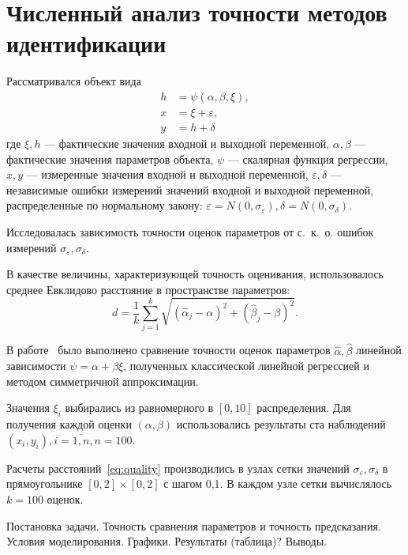 \section{Численный анализ точности методов идентификации}

Рассматривался объект вида
\begin{equation}
  \label{eq:model}
  \begin{aligned}
  h &= \psi (\alpha, \beta, \xi), \\
  x &= \xi + \varepsilon, \\
  y &= h + \delta
  \end{aligned}
\end{equation}
где
\( \xi, h \) --- фактические значения входной и выходной переменной,
\( \alpha, \beta \) --- фактические значения параметров объекта,
\( \psi \) --- скалярная функция регрессии,
\( x, y \) --- измеренные значения входной и выходной переменной,
\( \varepsilon, \delta \) --- независимые ошибки измерений значений входной и выходной переменной,
распределенные по нормальному закону:
\( \varepsilon = N(0, \sigma_{\varepsilon}), \delta = N(0, \sigma_{\delta}) \).

Исследовалась зависимость точности оценок параметров от с.~к.~о.
ошибок измерений \( \sigma_{\varepsilon}, \sigma_{\delta} \).

В качестве величины, характеризующей точность оценивания,
использовалось среднее Евклидово расстояние в пространстве параметров:
\begin{equation}
  \label{eq:quality}
  d = \frac{1}{k} \sum_{j=1}^k \sqrt{(\hat{\alpha}_j - \alpha)^2 + (\hat{\beta}_j - \beta)^2}.
\end{equation}

В работе~\cite{budny17} было выполнено сравнение точности оценок параметров
\( \hat{\alpha}, \hat{\beta} \) линейной зависимости \( \psi = \alpha + \beta \xi \),
полученных классической линейной регрессией и методом симметричной аппроксимации.

Значения \( \xi_i \) выбирались из равномерного в \( [0, 10] \) распределения.
Для получения каждой оценки \( ( \alpha, \beta ) \) использовались результаты
ста наблюдений \( ( x_i, y_i ), i = \overline{1, n}, n = 100 \).

Расчеты расстояний~\eqref{eq:quality} производились в узлах сетки значений
\( \sigma_{\varepsilon}, \sigma_{\delta} \) в прямоугольнике
\( [0, 2] \times [0, 2] \) с шагом 0{,}1.
В каждом узле сетки вычислялось \( k = 100 \) оценок.


Постановка задачи.
Точность сравнения параметров и точность предсказания.
Условия моделирования.
Графики.
Результаты (таблица)?
Выводы.